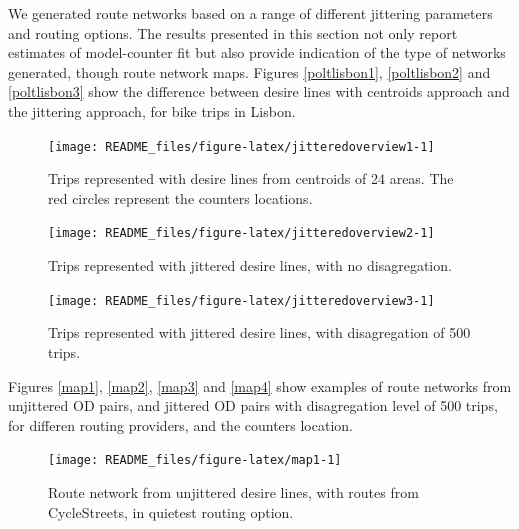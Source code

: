 \documentclass{isprs} %
\begin{document}
We generated route networks based on a range of different jittering parameters and routing options.
The results presented in this section not only report estimates of model-counter fit but also provide indication of the type of networks generated, though route network maps.
Figures \ref{poltlisbon1}, \ref{poltlisbon2} and \ref{poltlisbon3} show the difference between desire lines with centroids approach and the jittering approach, for bike trips in Lisbon.

\begin{figure}

{\centering \texttt{[image: README\_files/figure-latex/jitteredoverview1-1]} 

}

\caption{\label{poltlisbon1}Trips represented with desire lines from centroids of 24 areas. The red circles represent the counters locations.}\label{fig:jitteredoverview1}
\end{figure}

\begin{figure}

{\centering \texttt{[image: README\_files/figure-latex/jitteredoverview2-1]} 

}

\caption{\label{poltlisbon2}Trips represented with jittered desire lines, with no disagregation.}\label{fig:jitteredoverview2}
\end{figure}

\begin{figure}

{\centering \texttt{[image: README\_files/figure-latex/jitteredoverview3-1]} 

}

\caption{\label{poltlisbon3}Trips represented with jittered desire lines, with disagregation of 500 trips.}\label{fig:jitteredoverview3}
\end{figure}

Figures \ref{map1}, \ref{map2}, \ref{map3} and \ref{map4} show examples of route networks from unjittered OD pairs, and jittered OD pairs with disagregation level of 500 trips, for differen routing providers, and the counters location.

\begin{figure}

{\centering \texttt{[image: README\_files/figure-latex/map1-1]} 

}

\caption{\label{map1}Route network from unjittered desire lines, with routes from CycleStreets, in quietest routing option.}\label{fig:map1}
\end{figure}
\end{document}
